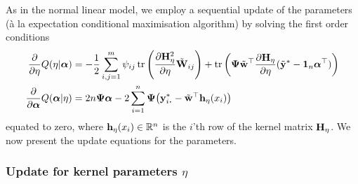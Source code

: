 As in the normal linear model, we employ a sequential update of the parameters (à la expectation conditional maximisation algorithm) by solving the first order conditions
\begin{align}
  \frac{\partial}{\partial\eta}Q(\eta|\balpha)
  &= -\half \sum_{i,j=1}^m \psi_{ij} \tr \left( \frac{\partial \bH_\eta^2}{\partial\eta} \tilde\bW_{ij} \right) 
  + \tr\left( \bPsi \tilde\bw^\top  \frac{\partial \bH_\eta}{\partial\eta} (\tilde\by^* - \bone_n\balpha^\top)  \right) \label{eq:vemeta} \\
  \frac{\partial}{\partial\balpha}Q(\balpha|\eta)
  &= 2n\bPsi\balpha - 2 \sum_{i=1}^n \bPsi \big(\by_{i\bigcdot}^* - \tilde\bw^\top\bh_\eta(x_i) \big) \label{eq:vemalpha}
\end{align}
equated to zero, where ${\mathbf h}_\eta(x_i) \in \mathbb{R}^n$ is the $i$'th row of the kernel matrix ${\mathbf H}_\eta$.
We now present the update equations for the parameters.
\vspace{-0.25em}

\subsubsection{Update for kernel parameters $\eta$}

